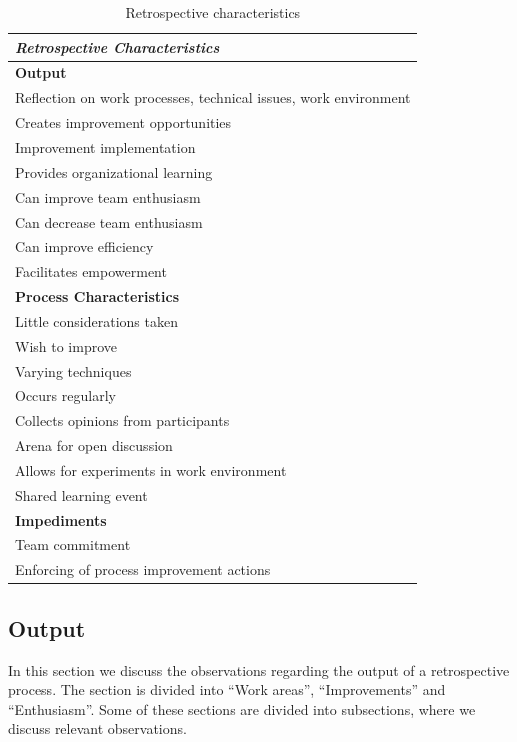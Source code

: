 \begin{table}[h]
	\begin{center}
		\caption{Retrospective characteristics}
		\label{table:retrospective-properties}
		\begin{tabular}{p{}}
			\hline
			\textit{Retrospective Characteristics}\\
			\hline
			\textbf{Output} \\
			Reflection on work processes, technical issues, work environment \\
			Creates improvement opportunities \\
			Improvement implementation \\
			Provides organizational learning \\
			Can improve team enthusiasm \\
			Can decrease team enthusiasm \\ 
			Can improve efficiency  \\
			Facilitates empowerment \\
			\hline 
			\textbf{Process Characteristics}\\
			Little considerations taken \\
			Wish to improve \\
			Varying techniques\\
			Occurs regularly\\
			Collects opinions from participants\\
			Arena for open discussion \\
			Allows for experiments in work environment\\
			Shared learning event\\
			\hline
			\textbf{Impediments}\\
			Team commitment\\
			Enforcing of process improvement actions\\
			\hline
		\end{tabular}
	\end{center}
\end{table}

\subsection{Output}
In this section we discuss the observations regarding the output of a retrospective process. The section is divided into ``Work areas'', ``Improvements'' and ``Enthusiasm''. Some of these sections are divided into subsections, where we discuss relevant observations.

